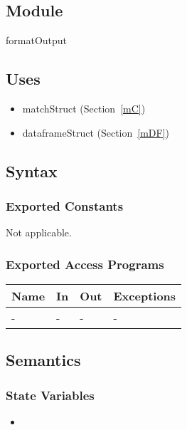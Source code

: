 \documentclass[12pt, titlepage]{article}
\begin{document}

\subsection{Module}

formatOutput

\subsection{Uses}
\begin{itemize}
\item matchStruct (Section~\ref{mC})
\item dataframeStruct (Section~\ref{mDF})
\end{itemize}

\subsection{Syntax}

\subsubsection{Exported Constants}
Not applicable.
\subsubsection{Exported Access Programs}

\begin{center}
\begin{tabular}{p{2cm} p{4cm} p{4cm} p{2cm}}
\hline
\textbf{Name} & \textbf{In} & \textbf{Out} & \textbf{Exceptions} \\
\hline
- & - & - & - \\
\hline
\end{tabular}
\end{center}

\subsection{Semantics}

\subsubsection{State Variables}
\begin{itemize}
  \item 
\end{itemize}
\end{document}
